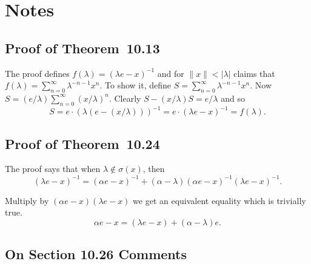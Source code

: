 
\section{Notes} %

\subsection{Proof of Theorem~10.13}

The proof defines \(f(\lambda) = (\lambda e - x)^{-1}\)
and for \(\|x\|< |\lambda |\) claims that
\(f(\lambda) = \sum_{n=0}^\infty \lambda^{-n-1} x^n\).
To show it, define \(S = \sum_{n=0}^\infty \lambda^{-n-1} x^n\).
Now \(S = (e/\lambda) \sum_{n=0}^\infty (x/\lambda)^n\).
Clearly \(S - (x/\lambda)S = e/\lambda\) and so 
\begin{equation*}
S
= e \cdot \left(\lambda(e - (x/\lambda))\right)^{-1}
= e \cdot (\lambda e - x)^{-1} = f(\lambda).
\end{equation*}

\subsection{Proof of Theorem~10.24}

The proof says that when \(\lambda \notin \sigma(x)\), then
\begin{equation*}
(\lambda e -x)^{-1}
= (\alpha e -x)^{-1}
  + (\alpha - \lambda)(\alpha  e -x)^{-1}(\lambda e -x)^{-1}.
\end{equation*}

Multiply by \((\alpha  e -x)(\lambda e -x)\) we get
an equivalent equality which is trivially true.
\begin{equation*}
\alpha  e -x = (\lambda e -x) + (\alpha - \lambda)e.
\end{equation*}


\subsection{On Section 10.26 Comments}

